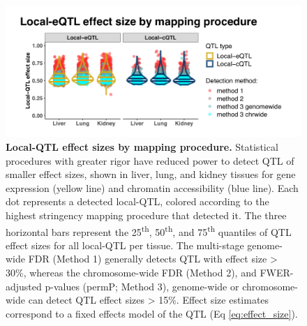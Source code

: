 \documentclass[9pt,twocolumn,twoside]{gsajnl}
\begin{document}
\begin{figure}[h]
\centering
\includegraphics[width=\textwidth, trim={0in 0in 0in 0in}, clip]{figs/qtl_effect_size_by_method.pdf}
\caption{\textbf{Local-QTL effect sizes by mapping procedure.} Statistical procedures with greater rigor have reduced power to detect QTL of smaller effect sizes, shown in liver, lung, and kidney tissues for gene expression (yellow line) and chromatin accessibility (blue line). Each dot represents a detected local-QTL, colored according to the highest stringency mapping procedure that detected it. The three horizontal bars represent the 25\textsuperscript{th}, 50\textsuperscript{th}, and 75\textsuperscript{th} quantiles of QTL effect sizes for all local-QTL per tissue. The multi-stage genome-wide FDR (Method 1) generally detects QTL with effect size > 30\%, whereas the chromosome-wide FDR (Method 2), and FWER-adjusted p-values (permP; Method 3), genome-wide or chromosome-wide can detect QTL effect sizes > 15\%. Effect size estimates correspond to a fixed effects model of the QTL (Eq \ref{eq:effect_size}).
\label{fig:qtl_effect_sizes_by_method}}
\end{figure}
\end{document}
